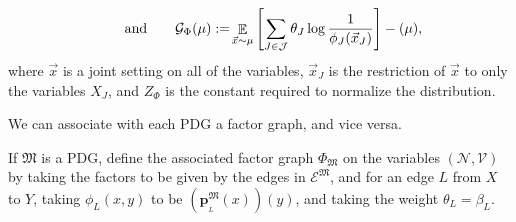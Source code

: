 \documentclass{article}
\theoremstyle{plain}
\theoremstyle{definition}
\theoremstyle{remark}
\let\H\relax
\DeclareMathOperator{\H}{\mathrm{H}} %
\DeclareMathOperator*{\E}{\mathbb{E}} %
\newcommand\mat[1]{\mathbf{#1}}
\newcommand{\bp}[1][L]{\mat{p}_{\!_{#1}\!}}
\newcommand{\V}{\mathcal V}
\newcommand{\N}{\mathcal N}
\newcommand{\Ed}{\mathcal E}
\newcommand{\dg}[1]{\mathfrak{#1}}
\newcommand{\ed}[3]{#2 \xrightarrow{\!\!\smash{#1}} #3}
\numberwithin{equation}{section}
\begin{document}
\begin{defn}
\[%
	\qquad\text{and}\qquad
	\mathcal G_\Phi(\mu) := \!\E_{\vec x\sim\mu}\left[  \sum_{J \in
                   \cal J} \theta_J \log\frac1{\phi_J(\vec
                   x_J)}\right] - \H(\mu)  , \]
	where $\vec{x}$ is a joint setting on all of the variables,
        $\vec{x}_J$ is the restriction of $\vec{x}$ to only the
        variables $X_J$, and $Z_\Phi$ is the constant required to
        normalize the distribution.  
\end{defn}
We can associate with each PDG a factor graph, and vice versa.
\begin{defn}\label{def:PDG2fg}
  If $\dg M$ is a PDG, define   
the associated factor graph $\Phi_{\dg M}$ on the	
variables $(\N,\V)$ by
taking the factors to be given by the edges in $\Ed^{\dg M}$, and for an
edge $L$ from $X$ to $Y$, taking $\phi_L(x,y)$ to be $(\bp^{\dg
  M}(x))(y)$, and taking the weight $\theta_L = \beta_L$.
\end{defn}
\end{document}
